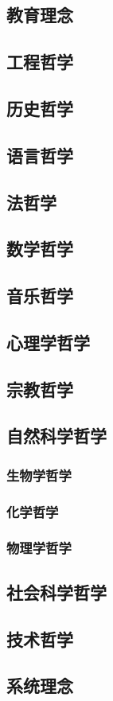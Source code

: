 \documentclass[UTF8]{../RepresentationUniverse}
\begin{document}
    \subsection{教育理念}
    \subsection{工程哲学}
    \subsection{历史哲学}
    \subsection{语言哲学}
    \subsection{法哲学}
    \subsection{数学哲学}
    \subsection{音乐哲学}
    \subsection{心理学哲学}
    \subsection{宗教哲学}
    \subsection{自然科学哲学}
    \subsubsection{生物学哲学}
    \subsubsection{化学哲学}
    \subsubsection{物理学哲学}
    \subsection{社会科学哲学}
    \subsection{技术哲学}
    \subsection{系统理念}
\end{document}
